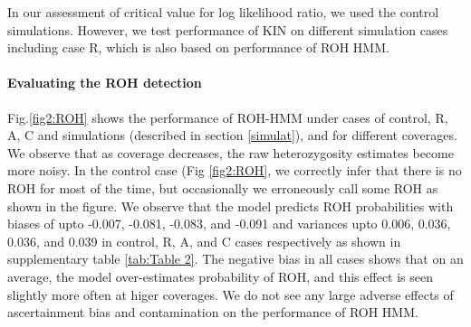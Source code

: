 \documentclass[12pt, letterpaper]{article}
\begin{document}
In our assessment of critical value for log likelihood ratio, we used the control simulations. However, we test performance of KIN on different simulation cases including case R, which is also based on performance of ROH HMM.

\paragraph{Evaluating the ROH detection}
 Fig.\ref{fig2:ROH} shows the performance of ROH-HMM under cases of control, R, A, C and simulations (described in section \ref{simulat}), and for different coverages. We observe that as coverage decreases, the raw heterozygosity estimates become more noisy. In the control case (Fig \ref{fig2:ROH}, we correctly infer that there is no ROH for most of the time, but occasionally we erroneously call some ROH as shown in the figure. We observe that the model predicts ROH probabilities with biases of upto -0.007, -0.081, -0.083, and -0.091 and variances upto 0.006, 0.036, 0.036, and 0.039 in control, R, A, and C cases respectively as shown in supplementary table \ref{tab:Table 2}. The negative bias in all cases shows that on an average, the model over-estimates probability of ROH, and this effect is seen slightly more often at higer coverages. We do not see any large adverse effects of ascertainment bias and contamination on the performance of ROH HMM.
\end{document}
